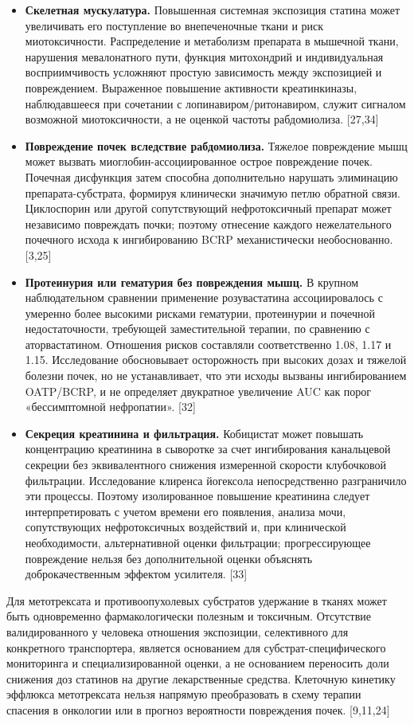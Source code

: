 \documentclass[11pt]{article}
\begin{document}
\begin{itemize}
\item \textbf{Скелетная мускулатура.} Повышенная системная экспозиция статина может увеличивать его поступление во внепеченочные ткани и риск миотоксичности. Распределение и метаболизм препарата в мышечной ткани, нарушения мевалонатного пути, функция митохондрий и индивидуальная восприимчивость усложняют простую зависимость между экспозицией и повреждением. Выраженное повышение активности креатинкиназы, наблюдавшееся при сочетании с лопинавиром/ритонавиром, служит сигналом возможной миотоксичности, а не оценкой частоты рабдомиолиза. [27,34]
\item \textbf{Повреждение почек вследствие рабдомиолиза.} Тяжелое повреждение мышц может вызвать миоглобин-ассоциированное острое повреждение почек. Почечная дисфункция затем способна дополнительно нарушать элиминацию препарата-субстрата, формируя клинически значимую петлю обратной связи. Циклоспорин или другой сопутствующий нефротоксичный препарат может независимо повреждать почки; поэтому отнесение каждого нежелательного почечного исхода к ингибированию BCRP механистически необоснованно. [3,25]
\item \textbf{Протеинурия или гематурия без повреждения мышц.} В крупном наблюдательном сравнении применение розувастатина ассоциировалось с умеренно более высокими рисками гематурии, протеинурии и почечной недостаточности, требующей заместительной терапии, по сравнению с аторвастатином. Отношения рисков составляли соответственно 1.08, 1.17 и 1.15. Исследование обосновывает осторожность при высоких дозах и тяжелой болезни почек, но не устанавливает, что эти исходы вызваны ингибированием OATP/BCRP, и не определяет двукратное увеличение AUC как порог «бессимптомной нефропатии». [32]
\item \textbf{Секреция креатинина и фильтрация.} Кобицистат может повышать концентрацию креатинина в сыворотке за счет ингибирования канальцевой секреции без эквивалентного снижения измеренной скорости клубочковой фильтрации. Исследование клиренса йогексола непосредственно разграничило эти процессы. Поэтому изолированное повышение креатинина следует интерпретировать с учетом времени его появления, анализа мочи, сопутствующих нефротоксичных воздействий и, при клинической необходимости, альтернативной оценки фильтрации; прогрессирующее повреждение нельзя без дополнительной оценки объяснять доброкачественным эффектом усилителя. [33]
\end{itemize}

Для метотрексата и противоопухолевых субстратов удержание в тканях может быть одновременно фармакологически полезным и токсичным. Отсутствие валидированного у человека отношения экспозиции, селективного для конкретного транспортера, является основанием для субстрат-специфического мониторинга и специализированной оценки, а не основанием переносить доли снижения доз статинов на другие лекарственные средства. Клеточную кинетику эффлюкса метотрексата нельзя напрямую преобразовать в схему терапии спасения в онкологии или в прогноз вероятности повреждения почек. [9,11,24]
\end{document}
